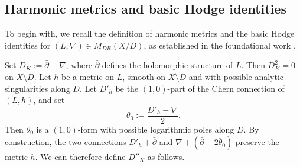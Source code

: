 \documentclass[english]{amsart}
\newcommand{\ol}{\overline}
\newcommand{\dbar}{\bar \partial}
\numberwithin{equation}{thm}
\begin{document}




\medskip

\subsection{Harmonic metrics and basic Hodge identities}\label{logflatsubsection}

To begin with, we recall the definition of harmonic metrics and the basic Hodge identities for $(L,\nabla)\in M_{DR}(X/D)$, as established in the foundational work \cite{Sim92}.

Set $D_K:=\dbar+\nabla$, where $\dbar$ defines the holomorphic structure of $L$. Then $D_K^2=0$ on $X\setminus D$.
Let $h$ be a metric on $L$, smooth on $X\setminus D$ and with possible analytic singularities along $D$.
Let $D'_h$ be the $(1,0)$-part of the Chern connection of $(L,h)$, and set
\[
\theta_0 := \frac{D'_h-\nabla}{2}.
\]
Then $\theta_0$ is a $(1,0)$-form with possible logarithmic poles along $D$.
By construction, the two connections $D'_h+\dbar$ and $\nabla+(\dbar-2\ol\theta_0)$ preserve the metric $h$.
We can therefore define $D''_K$ as follows.
\end{document}
